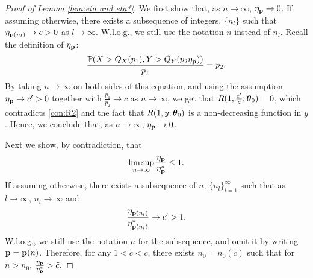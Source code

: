 \begin{proof}[Proof of Lemma \ref{lem:eta and eta*}]
    We first show that, as $n\to\infty$, $\eta_{\mathbf p}\to 0$. If assuming otherwise, there exists a subsequence of integers, $\{n_l\}$ such that $\eta_{{\mathbf p}(n_l)}\to c>0$ as $l\to\infty$. W.l.o.g., we still use the notation $n$ instead of $n_l$. Recall the definition of $\eta_{\mathbf p}$:
    $$\frac{{\mathbb P}(X>Q_X(p_1),Y>Q_Y(p_2\eta_{\mathbf p}))}{p_1}=p_2.$$
    By taking $n\to\infty$ on both sides of this equation, and using the assumption $\eta_{\mathbf p}\to c'>0$ together with $\frac{p_1}{p_2}\to c$ as $n\to\infty$, we get that
    $R(1,\frac{c'}{c};\boldsymbol{\theta}_0)=0$, which contradicts \ref{con:R2} and the fact that $R(1,y;\boldsymbol{\theta}_0)$ is a non-decreasing function in $y$. Hence, we conclude that, as $n\to\infty$, $\eta_{\mathbf p}\to 0$.
    
    
Next we show, by contradiction, that 
$$\limsup_{n\to\infty}\frac{\eta_{\mathbf p}}{\eta^*_{\mathbf p}}\leq 1.$$
If assuming otherwise, there exists a subsequence of $n$, $\{n_l\}_{l=1}^\infty$ such that as $l\to\infty$, $n_l\to\infty$ and
$$\frac{\eta_{{\mathbf p}(n_l)}}{\eta^*_{{\mathbf p}(n_l)}}\to c'>1.$$
W.l.o.g., we still use the notation $n$ for the subsequence, and omit it by writing ${\mathbf p}={\mathbf p}(n)$. Therefore, for any $1<\tilde c<c$, there exists $n_0=n_0(\tilde c)$ such that for $n>n_0$, $\frac{\eta_{\mathbf p}}{\eta^*_{\mathbf p}}>\tilde c.$


\end{proof}
